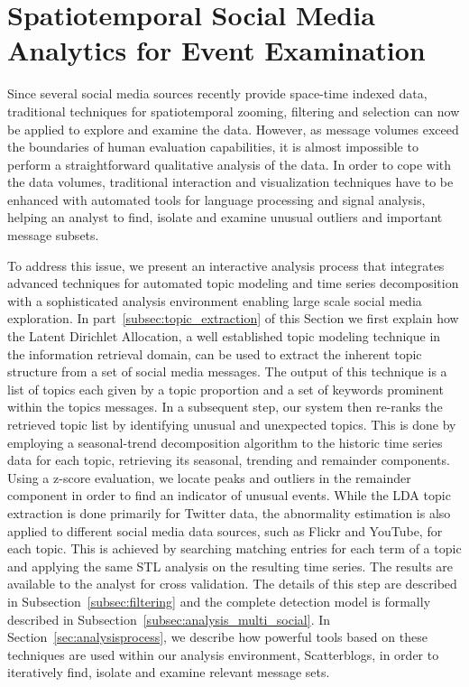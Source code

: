 \section{Spatiotemporal Social Media Analytics for Event Examination}
\label{sec:social_analytics}
Since several social media sources recently provide space-time indexed data, traditional techniques for spatiotemporal zooming, filtering and selection can now be applied to explore and examine the data.
However, as message volumes exceed the boundaries of human evaluation capabilities, it is almost impossible to perform a straightforward qualitative analysis of the data.
In order to cope with the data volumes, traditional interaction and visualization techniques have to be enhanced with automated tools for language processing and signal analysis, helping an analyst to find, isolate and examine unusual outliers and important message subsets.

To address this issue, we present an interactive analysis process that integrates advanced techniques for automated topic modeling and time series decomposition with a sophisticated analysis environment enabling large scale social media exploration. 
In part~\ref{subsec:topic_extraction} of this Section we first explain how the Latent Dirichlet Allocation, a well established topic modeling technique in the information retrieval domain, can be used to extract the inherent topic structure from a set of social media messages. The output of this technique is a list of topics each given by a topic proportion and a set of keywords prominent within the topics messages. In a subsequent step, our system then re-ranks the retrieved topic list by identifying unusual and unexpected topics. This is done by employing a seasonal-trend decomposition algorithm to the historic time series data for each topic, retrieving its seasonal, trending and remainder components. 
Using a z-score evaluation, we locate peaks and outliers in the remainder component in order to find an indicator of unusual events.
While the LDA topic extraction is done primarily for Twitter data, 
the abnormality estimation is also applied to different social media data sources, such as Flickr and YouTube, for each topic. 
This is achieved by searching matching entries for each term of a topic and applying the same STL analysis on the resulting time series.
The results are available to the analyst for cross validation.
The details of this step are described in Subsection~\ref{subsec:filtering} and the complete detection model is formally described in Subsection~\ref{subsec:analysis_multi_social}. In Section~\ref{sec:analysisprocess}, 
we describe how powerful tools based on these techniques are used within our analysis environment, Scatterblogs, 
in order to iteratively find, isolate and examine relevant message sets.

